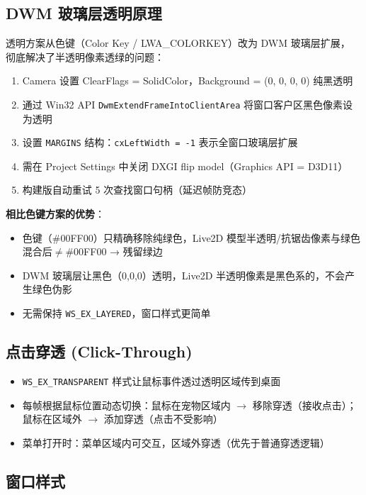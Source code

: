 \documentclass[12pt,a4paper]{ctexart}
\begin{document}
\subsection{DWM 玻璃层透明原理}

透明方案从色键（Color Key / LWA\_COLORKEY）改为 DWM 玻璃层扩展，
彻底解决了半透明像素透绿的问题：

\begin{enumerate}
    \item Camera 设置 ClearFlags = SolidColor，Background = (0, 0, 0, 0) 纯黑透明
    \item 通过 Win32 API \texttt{DwmExtendFrameIntoClientArea} 将窗口客户区黑色像素设为透明
    \item 设置 \texttt{MARGINS} 结构：\texttt{cxLeftWidth = -1} 表示全窗口玻璃层扩展
    \item 需在 Project Settings 中关闭 DXGI flip model（Graphics API = D3D11）
    \item 构建版自动重试 5 次查找窗口句柄（延迟帧防竞态）
\end{enumerate}

\textbf{相比色键方案的优势}：
\begin{itemize}
    \item 色键（\#00FF00）只精确移除纯绿色，Live2D 模型半透明/抗锯齿像素与绿色混合后$\neq$\#00FF00 → 残留绿边
    \item DWM 玻璃层让黑色（0,0,0）透明，Live2D 半透明像素是黑色系的，不会产生绿色伪影
    \item 无需保持 \texttt{WS\_EX\_LAYERED}，窗口样式更简单
\end{itemize}

\subsection{点击穿透 (Click-Through)}

\begin{itemize}
    \item \texttt{WS\_EX\_TRANSPARENT} 样式让鼠标事件透过透明区域传到桌面
    \item 每帧根据鼠标位置动态切换：鼠标在宠物区域内 $\to$ 移除穿透（接收点击）；
        鼠标在区域外 $\to$ 添加穿透（点击不受影响）
    \item 菜单打开时：菜单区域内可交互，区域外穿透（优先于普通穿透逻辑）
\end{itemize}

\subsection{窗口样式}
\end{document}

